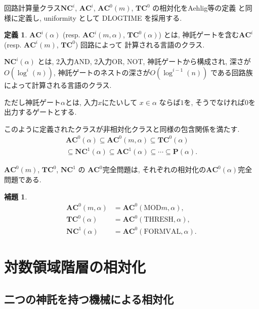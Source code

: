 \documentclass[10pt,a4paper,twocolumn]{jarticle}
\theoremstyle{definition}
\newtheorem{lemma}[theorem]{補題}
\newtheorem{definition}[theorem]{定義}
\theoremstyle{remark}
\newcommand{\classfont}{\mathbf}
\newcommand{\AC}{\classfont{AC}}
\newcommand{\TC}{\classfont{TC}}
\newcommand{\NC}{\classfont{NC}}
\renewcommand{\P}{\classfont{P}}
\newcommand{\probfont}{\text}
\newcommand{\MOD}{\probfont{MOD}}
\newcommand{\THRESH}{\probfont{THRESH}}
\newcommand{\FORMVAL}{\probfont{FORMVAL}}
\begin{document}
回路計算量クラス$\NC^i$, $\AC^i$, $\AC^0(m)$, $\TC^0$ の相対化をAehlig等の定義
\cite{aehlig2007relativizing} と同様に定義し,
uniformity として DLOGTIME を採用する.
\begin{definition}
$\AC^i(\alpha)$ (resp. $\AC^i(m, \alpha)$, $\TC^0(\alpha)$) とは,
神託ゲートを含む$\AC^i$ (resp. $\AC^i(m)$, $\TC^0$) 回路によって
計算される言語のクラス.

$\NC^i(\alpha)$ とは, 2入力AND, 2入力OR, NOT, 神託ゲートから構成され,
深さが$O(\log^i(n))$, 神託ゲートのネストの深さが$O(\log^{i-1}(n))$
である回路族によって計算される言語のクラス.
\end{definition}
ただし神託ゲート$\alpha$とは, 入力$x$にたいして $x \in \alpha$ ならば$1$を, 
そうでなければ$0$を出力するゲートとする.

このように定義されたクラスが非相対化クラスと同様の包含関係を満たす.
\begin{gather*}
 \AC^0(\alpha) \subseteq \AC^0(m, \alpha) \subseteq \TC^0(\alpha) \\
 \subseteq \NC^1(\alpha) \subseteq \AC^1(\alpha) \subseteq \cdots \subseteq \P(\alpha).
\end{gather*}

$\AC^0(m)$, $\TC^0$, $\NC^1$ の $\AC^0$完全問題は, 
それぞれの相対化の$\AC^0(\alpha)$完全問題である.
\begin{lemma}
\begin{align*}
 \AC^0(m, \alpha) &= \AC^0(\MOD m, \alpha),
 \\
 \TC^0(\alpha) &= \AC^0(\THRESH, \alpha),
 \\
 \NC^1(\alpha) &= \AC^0(\FORMVAL, \alpha).
\end{align*} 
\end{lemma}


\section{対数領域階層の相対化}
\subsection{二つの神託を持つ機械による相対化}
\label{subsection: two query tapes}
\newcommand{\qqueryalpha}{q_{\text{query}}^\alpha}
\newcommand{\qquerybeta}{q_{\text{query}}^\beta}
\newcommand{\qyes}{q_{\text{yes}}}
\newcommand{\qno}{q_{\text{no}}}
\newcommand{\qacc}{q_{\text{accept}}}
\end{document}
